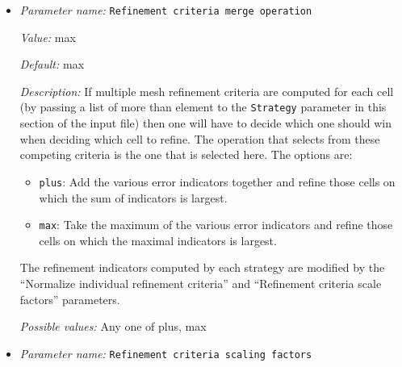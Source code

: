 \begin{itemize}
{\it Value:} true


{\it Default:} true


{\it Description:} If multiple refinement criteria are specified in the ``Strategy'' parameter, then they need to be combined somehow to form the final refinement indicators. This is done using the method described by the ``Refinement criteria merge operation'' parameter which can either operate on the raw refinement indicators returned by each strategy (i.e., dimensional quantities) or using normalized values where the indicators of each strategy are first normalized to the interval $[0,1]$ (which also makes them non-dimensional). This parameter determines whether this normalization will happen.


{\it Possible values:} A boolean value (true or false)
\item {\it Parameter name:} {\tt Refinement criteria merge operation}
\label{parameters:Mesh refinement/Refinement criteria merge operation}


{\it Value:} max


{\it Default:} max


{\it Description:} If multiple mesh refinement criteria are computed for each cell (by passing a list of more than element to the \texttt{Strategy} parameter in this section of the input file) then one will have to decide which one should win when deciding which cell to refine. The operation that selects from these competing criteria is the one that is selected here. The options are:

\begin{itemize}
\item \texttt{plus}: Add the various error indicators together and refine those cells on which the sum of indicators is largest.
\item \texttt{max}: Take the maximum of the various error indicators and refine those cells on which the maximal indicators is largest.
\end{itemize}The refinement indicators computed by each strategy are modified by the ``Normalize individual refinement criteria'' and ``Refinement criteria scale factors'' parameters.


{\it Possible values:} Any one of plus, max
\item {\it Parameter name:} {\tt Refinement criteria scaling factors}
\label{parameters:Mesh refinement/Refinement criteria scaling factors}



\end{itemize}
